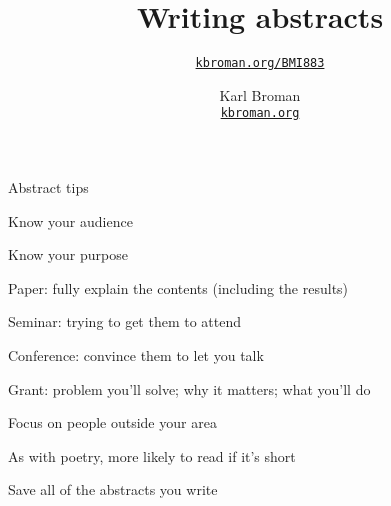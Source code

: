 \documentclass[aspectratio=169,12pt,t]{beamer}
\title{Writing abstracts}
\subtitle{}
\author{\href{https://kbroman.org/BMI883}{\tt kbroman.org/BMI883} }
\institute{}
\date{\small \hspace{3in} Karl Broman \\
  \hspace{3in} \href{https://kbroman.org}{\color{foreground}
    \small \tt kbroman.org}}
\begin{document}
{

\begin{frame}{Abstract tips}

  \bi
\item Know your audience
\item Know your purpose
  \bi
\item Paper: fully explain the contents (including the results)
\item Seminar: trying to get them to attend
\item Conference: convince them to let you talk
\item Grant: problem you'll solve; why it matters; what you'll do
   \ei
\item Focus on people outside your area
\item As with poetry, more likely to read if it's short
\item Save all of the abstracts you write
  \ei

\end{frame}
}
\end{document}
